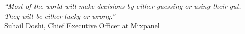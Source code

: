 \cleardoublepage
\thispagestyle{plain}

\vspace*{8cm}

\begin{flushright}
  \textsl{``Most of the world will make decisions by either guessing or using their gut.\\They will be either lucky or wrong.''}\\
\vspace*{1.5cm}
    Suhail Doshi, Chief Executive Officer at Mixpanel
\end{flushright}




